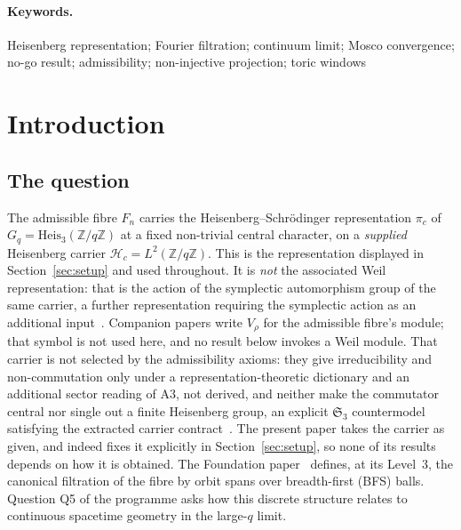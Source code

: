 \documentclass[11pt,a4paper]{article}
\theoremstyle{plain}
\theoremstyle{definition}
\theoremstyle{remark}
\newcommand{\Heis}{\mathrm{Heis}_3}
\newcommand{\Gq}{G_q}
\newcommand{\Z}{\mathbb{Z}}
\begin{document}
  \paragraph{Keywords.}
    Heisenberg representation; Fourier filtration; continuum limit; Mosco convergence; no-go result;
    admissibility; non-injective projection; toric windows

    \clearpage
    \tableofcontents

    \clearpage

  \section{Introduction}
  \label{sec:intro}

  \subsection{The question}

    The admissible fibre $F_n$ carries the Heisenberg--Schrödinger representation $\pi_c$
    of $\Gq = \Heis(\Z/q\Z)$ at a fixed non-trivial central character, on a \emph{supplied} Heisenberg
    carrier $\mathcal{H}_c = L^2(\Z/q\Z)$.
    This is the representation displayed in Section~\ref{sec:setup} and used throughout.
    It is \emph{not} the associated Weil representation: that is the action of the symplectic
    automorphism group of the same carrier, a further representation requiring the symplectic action
    as an additional input~\cite{Beau2026m,Beau2026HeisenbergStructure}.
    Companion papers write $V_\rho$ for the admissible fibre's module; that symbol is not used
    here, and no result below invokes a Weil module.
    That carrier is not selected by the admissibility axioms: they give irreducibility and
    non-commutation only under a representation-theoretic dictionary and an additional sector reading of A3,
    not derived, and neither make the commutator central nor single out a finite Heisenberg
    group, an explicit $\mathfrak{S}_3$ countermodel satisfying the extracted carrier
    contract~\cite{Beau2026m,Beau2026HeisenbergStructure}.
    The present paper takes the carrier as given, and indeed fixes it explicitly in
    Section~\ref{sec:setup}, so none of its results depends on how it is obtained.
    The Foundation paper~\cite{Beau2026m} defines, at its
    Level~3, the canonical filtration of the fibre by orbit spans over breadth-first (BFS) balls.
    Question Q5 of the programme asks how this discrete structure relates to continuous spacetime
    geometry in the large-$q$ limit.
\end{document}
